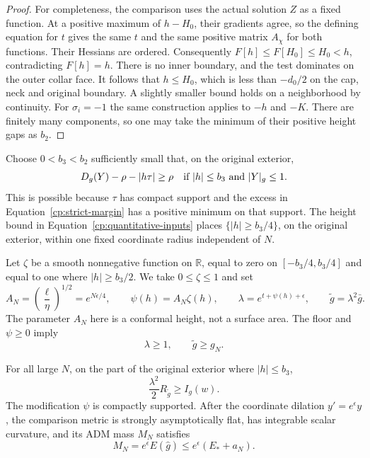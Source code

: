 \begin{proof}
For completeness, the comparison uses the actual solution $Z$ as a
fixed function.  At a positive maximum of $h-H_0$, their gradients
agree, so the defining equation for $t$ gives the same $t$ and the
same positive matrix $A_\chi$ for both functions.  Their Hessians
are ordered.  Consequently $F[h]\le F[H_0]\le H_0<h$, contradicting
$F[h]=h$.  There is no inner boundary, and the test dominates on the
outer collar face.  It follows that $h\le H_0$, which is less than
$-d_0/2$ on the cap, neck and original boundary.  A slightly smaller
bound holds on a neighborhood by continuity.  For $\sigma_i=-1$
the same construction applies to $-h$ and $-K$.  There are finitely
many components, so one may take the minimum of their positive
height gaps as $b_2$.
\end{proof}

Choose $0<b_3<b_2$ sufficiently small that, on the original exterior,
\begin{equation}\label{cp:tau-absorption}
 D_g(Y)-\rho-|h\tau|\ge\rho
 \quad\hbox{if } |h|\le b_3\hbox{ and }|Y|_g\le1.
\end{equation}
This is possible because $\tau$ has compact support and the excess in
Equation~\eqref{cp:strict-margin} has a positive minimum on that
support.  The height bound in Equation~\eqref{cp:quantitative-inputs}
places $\{|h|\ge b_3/4\}$, on the original exterior, within one fixed
coordinate radius independent of $N$.

Let $\zeta$ be a smooth nonnegative function on $\mathbb R$, equal to
zero on $[-b_3/4,b_3/4]$ and equal to one where $|h|\ge b_3/2$.
We take $0\le\zeta\le1$ and set
\begin{equation}\label{cp:plateau-metric}
 A_N=\left(\frac{\ell}{\eta}\right)^{1/2}
       =e^{N\epsilon/4},\qquad
 \psi(h)=A_N\zeta(h),\qquad
 \lambda=e^{t+\psi(h)+\epsilon},\qquad
 \widetilde g=\lambda^2\bar g.
\end{equation}
The parameter $A_N$ here is a conformal height, not a surface area.
The floor and $\psi\ge0$ imply
\begin{equation}\label{cp:metric-dominance}
 \lambda\ge1,\qquad \widetilde g\ge g_N.
\end{equation}

\begin{lemma}\label{cp:curvature}
For all large $N$, on the part of the original exterior where
$|h|\le b_3$,
\begin{equation}\label{cp:curvature-lower}
 \frac{\lambda^2}{2}R_{\widetilde g}\ge I_g(w).
\end{equation}
The modification $\psi$ is compactly supported.  After the coordinate
dilation $y'=e^\epsilon y$, the comparison metric is strongly
asymptotically flat, has integrable scalar curvature, and its ADM mass
$M_N$ satisfies
\begin{equation}\label{cp:comparison-mass}
 M_N=e^\epsilon E(\widehat g)
       \le e^\epsilon(E_*+a_N).
\end{equation}
\end{lemma}

